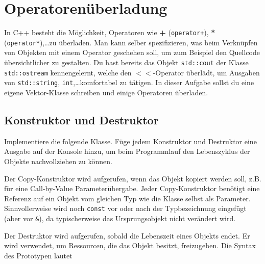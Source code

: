 \section{\ExercisePrefixBasics Operatorenüberladung}\label{sec:overloading}
In C++ besteht die Möglichkeit, Operatoren wie \textbf{+} (\lstinline{operator+}), \textbf{*} (\lstinline{operator*}),\dots zu überladen.
Man kann selber spezifizieren, was beim Verknüpfen von Objekten mit einem Operator geschehen soll, um zum Beispiel den Quellcode übersichtlicher zu gestalten.
Du hast bereits das Objekt \lstinline{std::cout} der Klasse \lstinline{std::ostream} kennengelernt, welche den $<<$-Operator überlädt, um Ausgaben von \lstinline{std::string}, \lstinline{int},\dots komfortabel zu tätigen.
In dieser Aufgabe sollst du eine eigene Vektor-Klasse schreiben und einige Operatoren überladen.


\subsection{Konstruktor und Destruktor}
Implementiere die folgende Klasse.
Füge jedem Konstruktor und Destruktor eine Ausgabe auf der Konsole hinzu, um beim Programmlauf den Lebenszyklus der Objekte nachvollziehen zu können.

  

Der Copy-Konstruktor wird aufgerufen, wenn das Objekt kopiert werden soll, z.B. für eine Call-by-Value Parameterübergabe.
Jeder Copy-Konstruktor benötigt eine Referenz auf ein Objekt vom gleichen Typ wie die Klasse selbst als Parameter. 
Sinnvollerweise wird noch \lstinline{const} vor oder nach der Typbezeichnung eingefügt (aber vor \lstinline{&}), da typischerweise das Ursprungsobjekt nicht verändert wird.

Der Destruktor wird aufgerufen, sobald die Lebenszeit eines Objekts endet. Er wird verwendet, um Ressourcen, die das Objekt besitzt, freizugeben.
Die Syntax des Prototypen lautet

